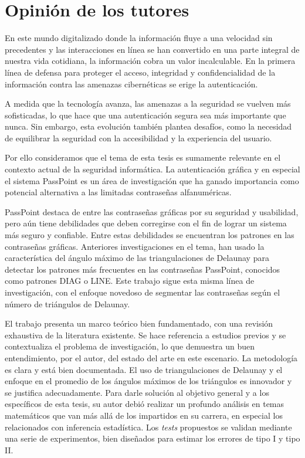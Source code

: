 \documentclass[12pt]{report}
\begin{document}
\chapter*{Opinión de los tutores}

En este mundo digitalizado donde la información fluye a una velocidad sin precedentes y las interacciones en línea se han convertido en una parte integral de nuestra vida cotidiana, la información cobra un valor incalculable. En la primera línea de defensa para proteger el acceso, integridad y confidencialidad de la información contra las amenazas cibernéticas se erige la autenticación. 

A medida que la tecnología avanza, las amenazas a la seguridad se vuelven más sofisticadas, lo que hace que una autenticación segura sea más importante que nunca. Sin embargo, esta evolución también plantea desafíos, como la necesidad de equilibrar la seguridad con la accesibilidad y la experiencia del usuario.

Por ello consideramos que el tema de esta tesis es sumamente relevante en el contexto actual de la seguridad informática. La autenticación gráfica y en especial el sistema PassPoint es un área de investigación que ha ganado importancia como potencial alternativa a las limitadas contraseñas alfanuméricas.

PassPoint destaca de entre las contraseñas gráficas por su seguridad y usabilidad, pero aún tiene debilidades que deben corregirse con el fin de lograr un sistema más seguro y confiable. Entre estas debilidades se encuentran los patrones en las contraseñas gráficas. Anteriores investigaciones en el tema, han usado la característica del ángulo máximo de las triangulaciones de Delaunay para detectar los patrones más frecuentes en las contraseñas PassPoint, conocidos como patrones DIAG o LINE. Este trabajo sigue esta misma línea de investigación, con el enfoque novedoso de segmentar las contraseñas según el número de triángulos de Delaunay.

El trabajo presenta un marco teórico bien fundamentado, con una revisión exhaustiva de la literatura existente. Se hace referencia a estudios previos y se contextualiza el problema de investigación, lo que demuestra un buen entendimiento, por el autor, del estado del arte en este escenario. La metodología es clara y está bien documentada. El uso de triangulaciones de Delaunay y el enfoque en el promedio de los ángulos máximos de los triángulos es innovador y se justifica adecuadamente. Para darle solución al objetivo general y a los específicos de esta tesis, su autor debió realizar un profundo análisis en temas matemáticos que van más allá de los impartidos en su carrera, en especial los relacionados con inferencia estadística. Los \textit{tests} propuestos se validan mediante una serie de experimentos, bien diseñados para estimar los errores de tipo I y tipo II.
\end{document}
